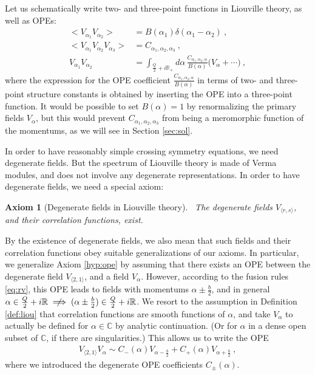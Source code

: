 \documentclass[12pt, a4paper]{article}
\theoremstyle{break}
\newtheorem{hyp}[exo]{Axiom}
\begin{document}
Let us schematically write two- and three-point functions in Liouville theory, as well as OPEs:
\begin{align}
 \Big< V_{\alpha_1}V_{\alpha_2} \Big>  &=  B(\alpha_1)\delta(\alpha_1-\alpha_2)\ ,
 \label{eq:vv}
 \\
 \Big< V_{\alpha_1}V_{\alpha_2}V_{\alpha_3} \Big> & = C_{\alpha_1,\alpha_2,\alpha_3} \ ,
 \label{eq:vvv}
 \\
 V_{\alpha_1}V_{\alpha_2} &= \int_{\frac{Q}{2}+i\mathbb{R}_+} d\alpha\, \frac{C_{\alpha_1,\alpha_2,\alpha}}{B(\alpha)} \Big( V_\alpha + \cdots\Big)\ ,
 \label{eq:v1v2}
\end{align}
where the expression for the OPE coefficient $\frac{C_{\alpha_1,\alpha_2,\alpha}}{B(\alpha)}$ in terms of two- and three-point structure constants is obtained by inserting the OPE into a three-point function. It would be possible to set $B(\alpha)=1$ by renormalizing the primary fields $V_{\alpha}$, but this would prevent $C_{\alpha_1,\alpha_2,\alpha_3}$ from being a meromorphic function of the momentums, as we will see in Section \ref{sec:sol}.

In order to have reasonably simple crossing symmetry equations, we need degenerate fields. 
But the spectrum of Liouville theory is made of Verma modules, and does not involve any degenerate representations.
In order to have degenerate fields, we need a special axiom:

\begin{hyp}[Degenerate fields in Liouville theory]
 ~\label{hyp:degl}
 The degenerate fields $V_{\langle r, s\rangle}$, and their correlation functions, exist. 
\end{hyp}
By the existence of degenerate fields, we also mean that such fields and their correlation functions obey suitable generalizations of our axioms. 
In particular, we generalize Axiom \ref{hyp:ope} by assuming that there exists an OPE between the degenerate field $V_{\langle 2, 1\rangle}$, and a field $V_\alpha$. 
However, according to the fusion rules \eqref{eq:rv}, this OPE leads to fields with momentums $\alpha\pm \frac{b}{2}$, and in general
$\alpha \in \frac{Q}{2}+i\mathbb{R} \centernot\implies (\alpha\pm\frac{b}{2}) \in \frac{Q}{2}+i\mathbb{R}$.
We resort to the assumption in Definition \ref{def:liou} that correlation functions are smooth functions of $\alpha$, and take $V_\alpha$ to actually be defined for $\alpha\in\mathbb{C}$ by analytic continuation. (Or for $\alpha$ in a dense open subset of $\mathbb{C}$, if there are singularities.) This allows us to write the OPE
\begin{align}
 V_{\langle 2, 1\rangle} V_\alpha \sim C_-(\alpha) V_{\alpha-\frac{b}{2}} + C_+(\alpha)V_{\alpha +\frac{b}{2}}\ ,
 \label{degope}
\end{align}
where we introduced the degenerate OPE coefficients $C_\pm(\alpha)$.
\end{document}
